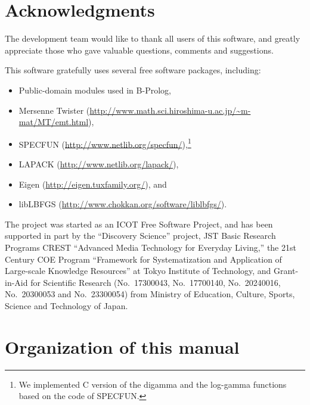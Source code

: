 \documentclass[a4paper]{report}
\begin{document}
\section*{Acknowledgments}


The development team would like to thank all users of this software,
and greatly appreciate those who gave valuable questions, comments and
suggestions.

This software gratefully uses several free software packages, including:
%
\begin{itemize}
\setlength{\parskip}{0pt}
\setlength{\itemsep}{2pt}
\item
  Public-domain modules used in B-Prolog,
\item
  Mersenne Twister
  (\url{http://www.math.sci.hiroshima-u.ac.jp/~m-mat/MT/emt.html}),
\item
  SPECFUN (\url{http://www.netlib.org/specfun/}),\footnote{
    We implemented C version of the digamma and the log-gamma functions
    based on the code of SPECFUN.
  }
\item
  LAPACK (\url{http://www.netlib.org/lapack/}),
\item
  Eigen (\url{http://eigen.tuxfamily.org/}), and
\item
  libLBFGS
  (\url{http://www.chokkan.org/software/liblbfgs/}).
\end{itemize}

The project was started as an ICOT Free Software Project,
and has been supported in part by the ``Discovery Science'' project,
JST Basic Research Programs CREST ``Advanced Media Technology for Everyday
Living,'' the 21st Century COE Program ``Framework for Systematization
and Application of Large-scale Knowledge Resources'' at Tokyo Institute
of Technology, and Grant-in-Aid for Scientific Research (No.~17300043,
No.~17700140, No.~20240016, No.~20300053 and No.~23300054)
from Ministry of Education, Culture, Sports, Science and Technology of Japan.


\section*{Organization of this manual}
\label{sec:overview:organization}
\end{document}
